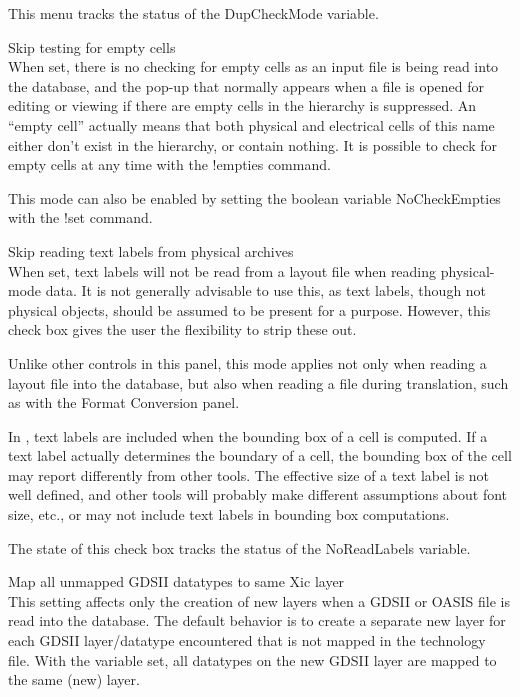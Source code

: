 \begin{description}
This menu tracks the status of the {\et DupCheckMode} variable.

\item{\cb Skip testing for empty cells}\\
When set, there is no checking for empty cells as an input file is
being read into the database, and the pop-up that normally appears
when a file is opened for editing or viewing if there are empty cells
in the hierarchy is suppressed.  An ``empty cell'' actually means that
both physical and electrical cells of this name either don't exist in
the hierarchy, or contain nothing.  It is possible to check for empty
cells at any time with the {\cb !empties} command.

This mode can also be enabled by setting the boolean variable {\et
NoCheckEmpties} with the {\cb !set} command.

\item{\cb Skip reading text labels from physical archives}\\
When set, text labels will not be read from a layout file when reading
physical-mode data.  It is not generally advisable to use this, as
text labels, though not physical objects, should be assumed to be
present for a purpose.  However, this check box gives the user the
flexibility to strip these out.

Unlike other controls in this panel, this mode applies not only when
reading a layout file into the database, but also when reading a file
during translation, such as with the {\cb Format Conversion} panel.

In {\Xic}, text labels are included when the bounding box of a cell is
computed.  If a text label actually determines the boundary of a cell,
the bounding box of the cell may report differently from other tools. 
The effective size of a text label is not well defined, and other
tools will probably make different assumptions about font size, etc.,
or may not include text labels in bounding box computations.

The state of this check box tracks the status of the {\et
NoReadLabels} variable.

\item{\cb Map all unmapped GDSII datatypes to same Xic layer}\\
This setting affects only the creation of new layers when a GDSII or
OASIS file is read into the database.  The default behavior is to
create a separate new {\Xic} layer for each GDSII layer/datatype
encountered that is not mapped in the technology file.  With the
variable set, all datatypes on the new GDSII layer are mapped to the
same (new) {\Xic} layer.


\end{description}
